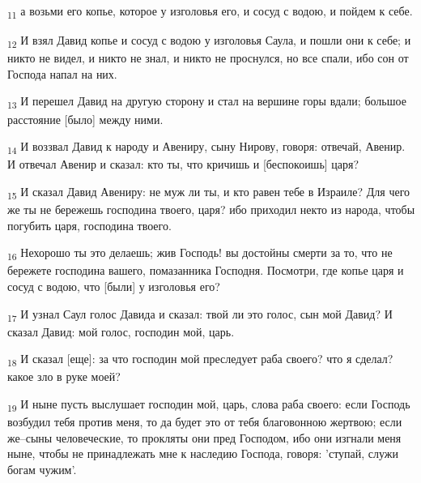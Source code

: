 \begin{tcolorbox}
\textsubscript{11} а возьми его копье, которое у изголовья его, и сосуд с водою, и пойдем к себе.
\end{tcolorbox}
\begin{tcolorbox}
\textsubscript{12} И взял Давид копье и сосуд с водою у изголовья Саула, и пошли они к себе; и никто не видел, и никто не знал, и никто не проснулся, но все спали, ибо сон от Господа напал на них.
\end{tcolorbox}
\begin{tcolorbox}
\textsubscript{13} И перешел Давид на другую сторону и стал на вершине горы вдали; большое расстояние [было] между ними.
\end{tcolorbox}
\begin{tcolorbox}
\textsubscript{14} И воззвал Давид к народу и Авениру, сыну Нирову, говоря: отвечай, Авенир. И отвечал Авенир и сказал: кто ты, что кричишь и [беспокоишь] царя?
\end{tcolorbox}
\begin{tcolorbox}
\textsubscript{15} И сказал Давид Авениру: не муж ли ты, и кто равен тебе в Израиле? Для чего же ты не бережешь господина твоего, царя? ибо приходил некто из народа, чтобы погубить царя, господина твоего.
\end{tcolorbox}
\begin{tcolorbox}
\textsubscript{16} Нехорошо ты это делаешь; жив Господь! вы достойны смерти за то, что не бережете господина вашего, помазанника Господня. Посмотри, где копье царя и сосуд с водою, что [были] у изголовья его?
\end{tcolorbox}
\begin{tcolorbox}
\textsubscript{17} И узнал Саул голос Давида и сказал: твой ли это голос, сын мой Давид? И сказал Давид: мой голос, господин мой, царь.
\end{tcolorbox}
\begin{tcolorbox}
\textsubscript{18} И сказал [еще]: за что господин мой преследует раба своего? что я сделал? какое зло в руке моей?
\end{tcolorbox}
\begin{tcolorbox}
\textsubscript{19} И ныне пусть выслушает господин мой, царь, слова раба своего: если Господь возбудил тебя против меня, то да будет это от тебя благовонною жертвою; если же--сыны человеческие, то прокляты они пред Господом, ибо они изгнали меня ныне, чтобы не принадлежать мне к наследию Господа, говоря: 'ступай, служи богам чужим'.
\end{tcolorbox}
